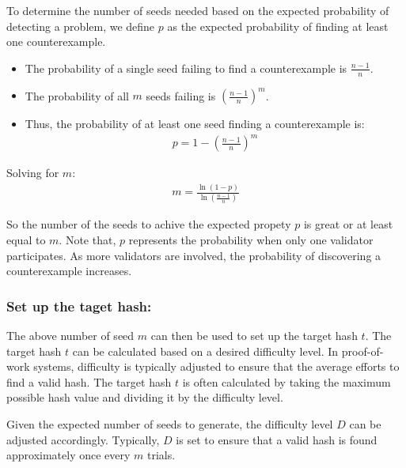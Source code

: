 \documentclass[runningheads]{llncs}
\begin{document}
To determine the number of seeds needed based on the expected probability of detecting a problem, we define \( p \) as the expected probability of finding at least one counterexample. 
\begin{itemize}
    \item The probability of a single seed failing to find a counterexample is \( \frac{n-1}{n} \).
    \item The probability of all \( m \) seeds failing is \( \left( \frac{n-1}{n} \right)^m \).
    \item Thus, the probability of at least one seed finding a counterexample is:
\begin{gather*}
  p = 1 - \left( \frac{n-1}{n} \right)^m
\end{gather*}
\end{itemize}
Solving for \( m \):
\begin{gather}
\label{eq:12}
m = \frac{\ln(1 - p)}{\ln\left( \frac{n-1}{n} \right)}
\end{gather}

So the number of the seeds to achive the expected propety $p$ is great or at least equal to $m$. Note that, \( p \) represents the probability when only one validator participates. As more validators are involved, the probability of discovering a counterexample increases.
\subsubsection{Set up the taget hash:}
The above number of seed $m$ can then be used to set up the target hash $t$. The target hash $t$ can be calculated based on a desired difficulty level. In proof-of-work systems, difficulty is typically adjusted to ensure that the average efforts to find a valid hash. The target hash $t$ is often calculated by taking the maximum possible hash value and dividing it by the difficulty level.

Given the expected number of seeds to generate, 
the difficulty level \( D \) can be adjusted accordingly. Typically, \( D \) is set to ensure that a valid hash is found approximately once every \( m \) trials.
\end{document}
